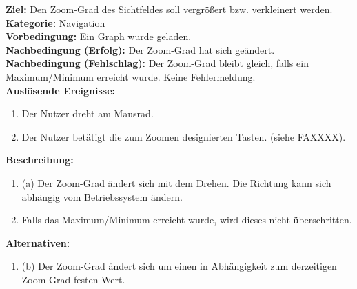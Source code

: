 \label{fa:zoomen}
\textbf{Ziel:} Den Zoom-Grad des Sichtfeldes soll vergrößert bzw. verkleinert werden. \\
\textbf{Kategorie:} Navigation \\
\textbf{Vorbedingung:} Ein Graph wurde geladen. \\
\textbf{Nachbedingung (Erfolg):} Der Zoom-Grad hat sich geändert. \\
\textbf{Nachbedingung (Fehlschlag):} Der Zoom-Grad bleibt gleich, falls ein Maximum/Minimum erreicht wurde. Keine Fehlermeldung. \\
\textbf{Auslösende Ereignisse:}
\begin{enumerate}[nolistsep, label=(\alph*)]
  \item Der Nutzer dreht am Mausrad.
  \item Der Nutzer betätigt die zum Zoomen designierten Tasten. (siehe FAXXXX). %
\end{enumerate}
\textbf{Beschreibung:}
\begin{enumerate}[nolistsep]
  \item (a) Der Zoom-Grad ändert sich mit dem Drehen. Die Richtung kann sich abhängig vom Betriebssystem ändern.
  \item Falls das Maximum/Minimum erreicht wurde, wird dieses nicht überschritten.
\end{enumerate}
\textbf{Alternativen:}
\begin{enumerate}[nolistsep]
  \item (b) Der Zoom-Grad ändert sich um einen in Abhängigkeit zum derzeitigen Zoom-Grad festen Wert.
\end{enumerate}

